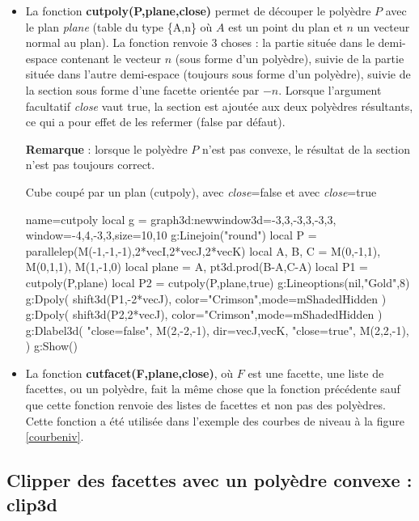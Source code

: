 \begin{itemize}
    \item La fonction \textbf{cutpoly(P,plane,close)} permet de découper le polyèdre $P$ avec le plan \emph{plane} (table du type \{A,n\} où $A$ est un point du plan et $n$ un vecteur normal au plan). La fonction renvoie 3 choses : la partie située dans le demi-espace contenant le vecteur $n$ (sous forme d'un polyèdre), suivie de la partie située dans l'autre demi-espace (toujours sous forme d'un polyèdre), suivie de la section sous forme d'une facette orientée par $-n$. Lorsque l'argument facultatif \emph{close} vaut true, la section est ajoutée aux deux polyèdres résultants, ce qui a pour effet de les refermer (false par défaut).\par
    \textbf{Remarque} : lorsque le polyèdre $P$ n'est pas convexe, le résultat de la section n'est pas toujours correct.

\begin{demo}{Cube coupé par un plan (cutpoly), avec \emph{close}=false et avec \emph{close}=true}
\begin{luadraw}{name=cutpoly}
local g = graph3d:new{window3d={-3,3,-3,3,-3,3}, window={-4,4,-3,3},size={10,10}}
g:Linejoin("round")
local P = parallelep(M(-1,-1,-1),2*vecI,2*vecJ,2*vecK)
local A, B, C = M(0,-1,1), M(0,1,1), M(1,-1,0)
local plane = {A, pt3d.prod(B-A,C-A)}
local P1 = cutpoly(P,plane)
local P2 = cutpoly(P,plane,true)
g:Lineoptions(nil,"Gold",8)
g:Dpoly( shift3d(P1,-2*vecJ), {color="Crimson",mode=mShadedHidden} )
g:Dpoly( shift3d(P2,2*vecJ), {color="Crimson",mode=mShadedHidden} )
g:Dlabel3d(
    "close=false", M(2,-2,-1), {dir={vecJ,vecK}},
    "close=true", M(2,2,-1), {}
    )
g:Show()            
\end{luadraw}
\end{demo}

     \item La fonction \textbf{cutfacet(F,plane,close)}, où $F$ est une facette, une liste de facettes, ou un polyèdre, fait la même chose que la fonction précédente sauf que cette fonction renvoie des listes de facettes et non pas des polyèdres. Cette fonction a été utilisée dans l'exemple des courbes de niveau à la figure \ref{courbeniv}.
\end{itemize}

\subsection{Clipper des facettes avec un polyèdre convexe : clip3d}

